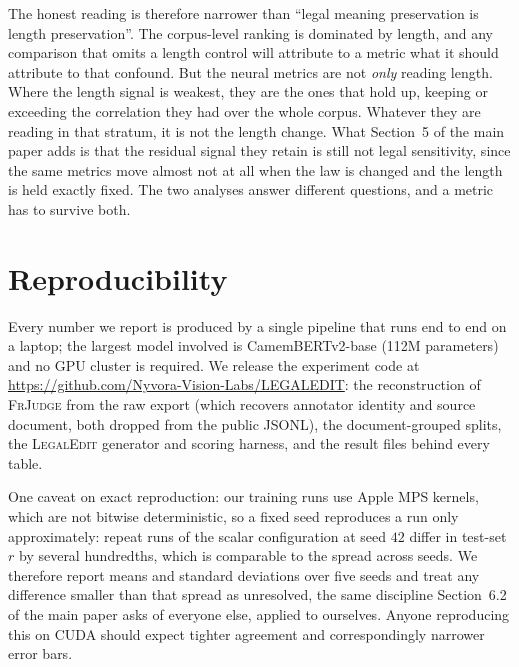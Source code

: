 \documentclass[11pt]{article}
\begin{document}
The honest reading is therefore narrower than ``legal meaning preservation is
length preservation''. The corpus-level ranking is dominated by length, and any
comparison that omits a length control will attribute to a metric what it should
attribute to that confound. But the neural metrics are not \emph{only} reading
length. Where the length signal is weakest, they are the ones that hold up, keeping or
exceeding the correlation they had over the whole corpus. Whatever they are
reading in that stratum, it is not the length change. What
Section~5 of the main paper adds is that the residual signal they retain is still not
legal sensitivity, since the same metrics move almost not at all when the law is
changed and the length is held exactly fixed. The two analyses answer different
questions, and a metric has to survive both.

\section{Reproducibility}
\label{app:repro}

Every number we report is produced by a single pipeline that runs end to end
on a laptop; the largest model involved is CamemBERTv2-base (112M parameters)
and no GPU cluster is required. We release the experiment code at
\url{https://github.com/Nyvora-Vision-Labs/LEGALEDIT}: the
reconstruction of \textsc{FrJudge} from the raw export (which recovers annotator
identity and source document, both dropped from the public JSONL), the
document-grouped splits, the \textsc{LegalEdit} generator and scoring harness,
and the result files behind every table.

One caveat on exact reproduction: our training runs use Apple MPS kernels, which
are not bitwise deterministic, so a fixed seed reproduces a run only
approximately: repeat runs of the scalar configuration at seed $42$ differ in
test-set $r$ by several hundredths, which is comparable to the spread across
seeds. We therefore report means and standard deviations over five seeds and
treat any difference smaller than that spread as unresolved, the same discipline
Section~6.2 of the main paper asks of everyone else, applied to ourselves. Anyone
reproducing this on CUDA should expect tighter agreement and correspondingly
narrower error bars.
\end{document}

